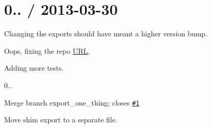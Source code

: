 \section*{0.. / 2013-\/03-\/30 }


\begin{DoxyItemize}
\item Changing the exports should have meant a higher version bump.
\item Oops, fixing the repo \mbox{\hyperlink{namespace_u_r_l}{U\+RL}}.
\item Adding more tests.
\item 0..
\item Merge branch \textquotesingle{}export\+\_\+one\+\_\+thing\textquotesingle{}; closes \href{https://github.com/ljharb/object-keys/issues/1}{\tt \#1}
\item Move shim export to a separate file. 
\end{DoxyItemize}